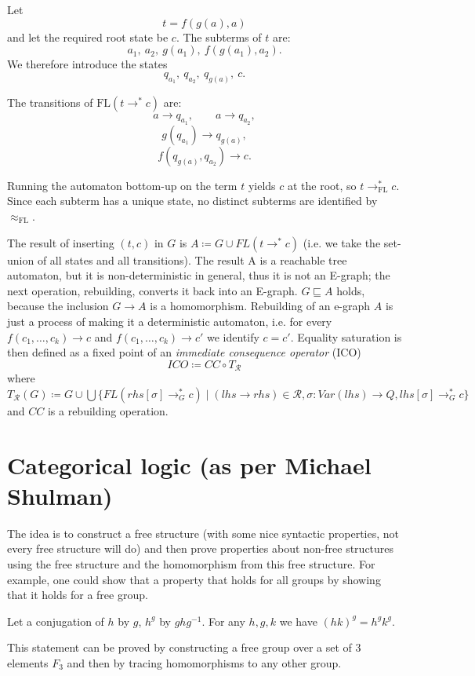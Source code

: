 \documentclass[acmsmall,screen, nonacm, anonymous]{acmart}
\begin{document}
\begin{example}
Let
\[
    t = f(g(a), a)
\]
and let the required root state be $c$.
The subterms of $t$ are:
\[
    a_1,\ a_2,\ g(a_1),\ f(g(a_1), a_2).
\]
We therefore introduce the states
\[
    q_{a_1},\ q_{a_2},\ q_{g(a)},\ c.
\]

The transitions of $\mathrm{FL}(t \to^* c)$ are:
\[
    a \to q_{a_1}, \qquad
    a \to q_{a_2},
\]
\[
    g(q_{a_1}) \to q_{g(a)},
\]
\[
    f(q_{g(a)}, q_{a_2}) \to c.
\]

Running the automaton bottom-up on the term $t$ yields $c$ at the root, so $t \to^*_{\mathrm{FL}} c$.  
Since each subterm has a unique state, no distinct subterms are identified by $\approx_{\mathrm{FL}}$.
\end{example}

The result of inserting $(t,c)$ in $G$ is $A \coloneqq G \cup FL(t \to^{*} c)$ (i.e. we take the set-union of all states and all transitions).
The result A is a reachable tree automaton, but it is non-deterministic in general, thus it is not an E-graph; the next operation, rebuilding, converts it back into an E-graph. 
$G \sqsubseteq A$ holds, because the inclusion $G \to A$ is a homomorphism.
Rebuilding of an e-graph $A$ is just a process of making it a deterministic automaton, i.e. for every $f(c_1, \ldots, c_k) \to c$ and $f(c_1, \ldots, c_k) \to c'$ we identify $c = c'$.
Equality saturation is then defined as a fixed point of an \emph{immediate consequence operator} (ICO)
\[
ICO \coloneqq CC \circ T_{\mathcal{R}}
\]
where $T_{\mathcal{R}}(G) \coloneqq G \cup \bigcup \{FL(rhs[\sigma] \to^{*}_{G} c) \mid (lhs \to rhs) \in \mathcal{R}, \sigma : Var(lhs) \to Q, lhs[\sigma] \to^{*}_{G} c\}$ and $CC$ is a rebuilding operation.

\section{Categorical logic (as per Michael Shulman)}

The idea is to construct a free structure (with some nice syntactic properties, not every free structure will do) and then prove properties about non-free structures using the free structure and the homomorphism from this free structure.
For example, one could show that a property that holds for all groups by showing that it holds for a free group.

\begin{example}

Let a conjugation of $h$ by $g$, $h^{g}$ by $ghg^{-1}$.
For any $h,g,k$ we have $(hk)^{g} = h^{g}k^{g}$.

This statement can be proved by constructing a free group over a set of 3 elements $F_{3}$ and then by tracing homomorphisms to any other group.
\end{example}
\end{document}
